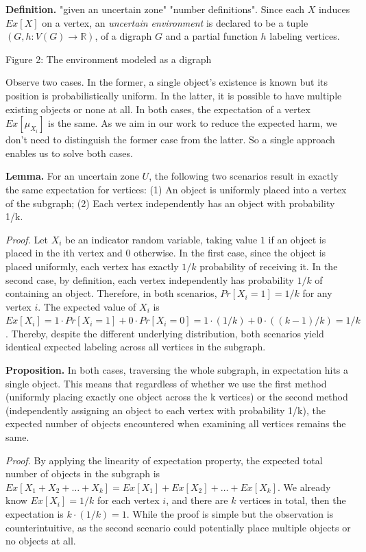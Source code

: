 \textbf{Definition.} "given an uncertain zone" "number definitions". Since each $X$ induces $Ex[X]$ on a vertex, an \textit{uncertain environment} is declared to be a tuple $(G, h:V(G) \rightarrow \mathbb{R} )$, of a digraph $G$ and a partial function $h$ labeling vertices.


\begin{center}
    Figure 2: The environment modeled as a digraph
\end{center}

\vspace{5mm}

Observe two cases. In the former, a single object's existence is known but its position is probabilistically uniform. In the latter, it is possible to have multiple existing objects or none at all. In both cases, the expectation of a vertex $Ex[\mu_{X_i}]$ is the same. As we aim in our work to reduce the expected harm, we don't need to distinguish the former case from the latter. So a single approach enables us to solve both cases.

\textbf{Lemma.} For an uncertain zone $U$, the following two scenarios result in exactly the same expectation for vertices: (1) An object is uniformly placed into a vertex of the subgraph; (2) Each vertex independently has an object with probability 1/k.

\textit{Proof.} Let $X_i$ be an indicator random variable, taking value $1$ if an object is placed in the ith vertex and $0$ otherwise. In the first case, since the object is placed uniformly, each vertex has exactly $1/k$ probability of receiving it. In the second case, by definition, each vertex independently has probability $1/k$ of containing an object. Therefore, in both scenarios, $Pr[X_i=1] = 1/k$ for any vertex $i$. The expected value of $X_i$ is $Ex[X_i] = 1 · Pr[X_i=1] + 0 · Pr[X_i=0] = 1 · (1/k) + 0 · ((k-1)/k) = 1/k$. Thereby, despite the different underlying distribution, both scenarios yield identical expected labeling across all vertices in the subgraph.

\textbf{Proposition.} In both cases, traversing the whole subgraph, in expectation hits a single object. This means that regardless of whether we use the first method (uniformly placing exactly one object across the k vertices) or the second method (independently assigning an object to each vertex with probability 1/k), the expected number of objects encountered when examining all vertices remains the same.

\textit{Proof.} By applying the linearity of expectation property, the expected total number of objects in the subgraph is $Ex[X_1 + X_2 + \dots + X_k] = Ex[X_1] + Ex[X_2] + \dots + Ex[X_k]$. We already know $Ex[X_i] = 1/k$ for each vertex $i$, and there are $k$ vertices in total, then the expectation is $k · (1/k) = 1$. While the proof is simple but the observation is counterintuitive, as the second scenario could potentially place multiple objects or no objects at all.
